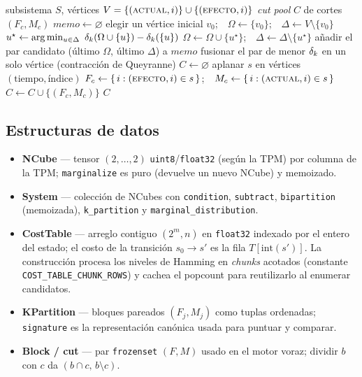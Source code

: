 \documentclass[11pt,letterpaper]{article}
\begin{document}
\begin{algorithm}[H]
	\caption{\textsc{KQNodesCutPool} — \emph{cut pool} submodular (Queyranne)}
	\label{alg:kqnodes}
	\begin{algorithmic}[1]
		\Require subsistema $S$, vértices $V = \{(\textsc{actual},i)\} \cup \{(\textsc{efecto},i)\}$
		\Ensure \emph{cut pool} $C$ de cortes $(F_c, M_c)$
		\State $\mathit{memo} \gets \varnothing$ 
		 
		\State elegir un vértice inicial $v_0$;\ \ $\Omega \gets \{v_0\}$;\ \ $\Delta \gets V \setminus \{v_0\}$
		\State $u^\star \gets \arg\min_{u \in \Delta}\ \dk(\Omega \cup \{u\}) - \dk(\{u\})$ 
		\State $\Omega \gets \Omega \cup \{u^\star\}$;\ \ $\Delta \gets \Delta \setminus \{u^\star\}$
		\EndWhile
		\State añadir el par candidato (último $\Omega$, último $\Delta$) a $\mathit{memo}$
		\State fusionar el par de menor $\delta_k$ en un solo vértice (contracción de Queyranne)
		\EndWhile
		\State $C \gets \varnothing$
		\State aplanar $s$ en vértices $(\text{tiempo},\text{índice})$
		\State $F_c \gets \{\,i : (\textsc{efecto},i) \in s\,\}$;\ \ $M_c \gets \{\,i : (\textsc{actual},i) \in s\,\}$
		\State $C \gets C \cup \{(F_c, M_c)\}$
		\EndFor
		\State \Return $C$ 
	\end{algorithmic}
\end{algorithm}

\subsection{Estructuras de datos}
\begin{itemize}
	\item \textbf{NCube} — tensor $(2,\dots,2)$ \texttt{uint8}/\texttt{float32} (según la TPM) por columna de la
	      TPM; \texttt{marginalize} es puro (devuelve un nuevo NCube) y memoizado.
	\item \textbf{System} — colección de NCubes con \texttt{condition},
	      \texttt{subtract}, \texttt{bipartition} (memoizada), \texttt{k\_partition} y
	      \texttt{marginal\_distribution}.
	\item \textbf{CostTable} — arreglo contiguo $(2^m, n)$ en \texttt{float32}
	      indexado por el entero del estado; el costo de la transición $s_0 \to s'$ es la
	      fila $T[\mathrm{int}(s')]$. La construcción procesa los niveles de Hamming en
	      \emph{chunks} acotados (constante \texttt{COST\_TABLE\_CHUNK\_ROWS}) y cachea el
	      popcount para reutilizarlo al enumerar candidatos.
	\item \textbf{KPartition} — bloques pareados $(F_j, M_j)$ como tuplas
	      ordenadas; \texttt{signature} es la representación canónica usada para puntuar y
	      comparar.
	\item \textbf{Block / cut} — par \texttt{frozenset} $(F,M)$ usado en el motor
	      voraz; dividir $b$ con $c$ da $(b\cap c,\, b\setminus c)$.
\end{itemize}
\end{document}
